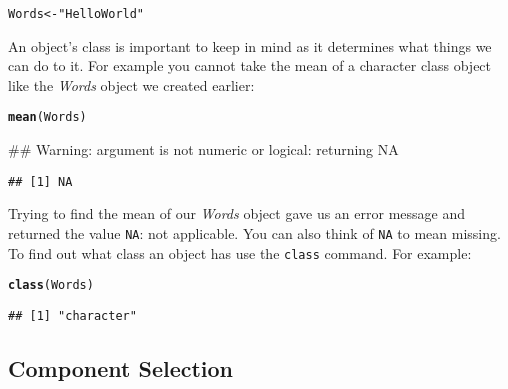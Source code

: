 \documentclass[ChapterTOCs,krantz1]{krantz}\usepackage{graphicx, color}
\makeatletter
\newcommand{\hlfunctioncall}[1]{\textcolor[rgb]{0.501960784313725,0,0.329411764705882}{\textbf{#1}}}%
\newcommand{\hlstring}[1]{\textcolor[rgb]{0.6,0.6,1}{#1}}%
\newenvironment{kframe}{%
 \def\at@end@of@kframe{}%
 \ifinner\ifhmode%
  \def\at@end@of@kframe{\end{minipage}}%
  \begin{minipage}{\columnwidth}%
 \fi\fi%
 \def\FrameCommand##1{\hskip\@totalleftmargin \hskip-\fboxsep
 \colorbox{shadecolor}{##1}\hskip-\fboxsep
     \hskip-\linewidth \hskip-\@totalleftmargin \hskip\columnwidth}%
 \MakeFramed {\advance\hsize-\width
   \@totalleftmargin\z@ \linewidth\hsize
   \@setminipage}}%
 {\par\unskip\endMakeFramed%
 \at@end@of@kframe}
\newenvironment{knitrout}{}{} %
\makeatother
\begin{document}
\begin{knitrout}
\color{fgcolor}\begin{kframe}
\begin{alltt}
Words <- \hlstring{"Hello World"}
\end{alltt}
\end{kframe}
\end{knitrout}



An object's class is important to keep in mind as it determines what things we can do to it. For example you cannot take the mean of a character class object like the {\emph{Words}} object we created earlier:

\begin{knitrout}
\color{fgcolor}\begin{kframe}
\begin{alltt}
\hlfunctioncall{mean}(Words)
\end{alltt}


{\ttfamily\noindent\textcolor{warningcolor}{\#\# Warning: argument is not numeric or logical: returning NA}}\begin{verbatim}
## [1] NA
\end{verbatim}
\end{kframe}
\end{knitrout}


\noindent Trying to find the mean of our {\emph{Words}} object gave us an error message and returned the value {\tt{NA}}: not applicable. You can also think of {\tt{NA}} to mean missing. To find out what class an object has use the {\tt{class}} command. For example:

\begin{knitrout}
\color{fgcolor}\begin{kframe}
\begin{alltt}
\hlfunctioncall{class}(Words)
\end{alltt}
\begin{verbatim}
## [1] "character"
\end{verbatim}
\end{kframe}
\end{knitrout}


\subsection{Component Selection}
\end{document}
